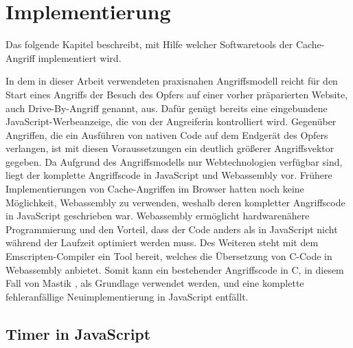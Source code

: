 \chapter{Implementierung}
\label{chapter:preparation}


Das folgende Kapitel beschreibt, mit Hilfe welcher Softwaretools der Cache-Angriff implementiert wird.

In dem in dieser Arbeit verwendeten praxisnahen Angriffsmodell reicht für den Start eines Angriffs der Besuch des Opfers auf einer vorher präparierten Website, auch Drive-By-Angriff genannt, aus. 
Dafür genügt bereits eine eingebundene JavaScript-Werbeanzeige, die von der Angreiferin kontrolliert wird. 
Gegenüber Angriffen, die ein Ausführen von nativen Code auf dem Endgerät des Opfers verlangen, ist mit diesen Voraussetzungen ein deutlich größerer Angriffsvektor gegeben.
Da Aufgrund des Angriffsmodells nur Webtechnologien verfügbar sind, liegt der komplette Angriffscode in JavaScript und Webassembly vor. 
Frühere Implementierungen von Cache-Angriffen im Browser \cite{TheSpyInTheSandbox} hatten noch keine Möglichkeit, Webassembly zu verwenden, weshalb deren kompletter Angriffscode in JavaScript geschrieben war. 
Webassembly ermöglicht hardwarenähere Programmierung und den Vorteil, dass der Code anders als in JavaScript nicht während der Laufzeit optimiert werden muss. 
Des Weiteren steht mit dem Emscripten-Compiler ein Tool bereit, welches die Übersetzung von C-Code in Webassembly anbietet. Somit kann ein bestehender Angriffscode in C, in diesem Fall von Mastik \cite{Mastik}, als Grundlage verwendet werden, und eine komplette fehleranfällige Neuimplementierung in JavaScript entfällt.

\section{Timer in JavaScript}

